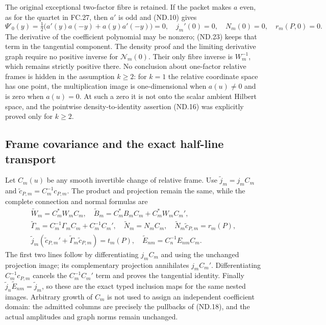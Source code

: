 The original exceptional two-factor fibre is retained. If the packet
makes \(a\) even, as for the quartet in FC.27, then \(a'\) is odd
and (ND.10) gives
\[
 \Psi'_0(y)=\tfrac12\bigl(a'(y)a(-y)+a(y)a'(-y)\bigr)=0,
 \quad j_m'(0)=0,\quad N_m(0)=0,\quad r_m(P,0)=0.
 \tag{ND.32}
\]
The derivative of the coefficient polynomial may be nonzero; (ND.23)
keeps that term in the tangential component. The density proof and
the limiting derivative graph require no positive inverse for
\(\mathcal N_m(0)\). Their only fibre inverse is \(W_m^{-1}\),
which remains strictly positive there. No conclusion about one-factor
relative frames is hidden in the assumption \(k\ge2\): for \(k=1\)
the relative coordinate space has one point, the multiplication image
is one-dimensional when \(a(u)\ne0\) and is zero when \(a(u)=0\).
At such a zero it is not onto the scalar ambient Hilbert space, and
the pointwise density-to-identity assertion (ND.16) was explicitly
proved only for \(k\ge2\).

\subsection{Frame covariance and the exact half-line transport}

Let \(C_m(u)\) be any smooth invertible change of relative frame.
Use \(\widetilde j_m=j_m C_m\) and
\(\widetilde c_{P,m}=C_m^{-1}c_{P,m}\). The product and projection
remain the same, while the complete connection and normal formulas are
\[
 \begin{gathered}
 \widetilde W_m=C_m^*W_mC_m,\quad
 \widetilde B_m=C_m^*B_mC_m+C_m^*W_mC_m',\\
 \widetilde\Gamma_m=C_m^{-1}\Gamma_mC_m+C_m^{-1}C_m',\quad
 \widetilde N_m=N_mC_m,\quad
 \widetilde N_m\widetilde c_{P,m}=r_m(P),\\
 \widetilde j_m(\widetilde c_{P,m}'
                +\widetilde\Gamma_m\widetilde c_{P,m})=t_m(P),
 \quad \widetilde E_{nm}=C_n^{-1}E_{nm}C_m.
 \end{gathered}
 \tag{ND.33}
\]
The first two lines follow by differentiating \(j_mC_m\) and
using the unchanged projection image; its complementary projection
annihilates \(j_mC_m'\). Differentiating
\(C_m^{-1}c_{P,m}\) cancels the \(C_m^{-1}C_m'\) term and
proves the tangential identity. Finally
\(\widetilde j_n\widetilde E_{nm}=\widetilde j_m\), so these
are the exact typed inclusion maps for the same nested images.
Arbitrary growth of \(C_m\) is not used to assign an independent
coefficient domain: the admitted columns are precisely the pullbacks
of (ND.18), and the actual amplitudes and graph norms remain unchanged.

